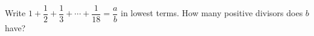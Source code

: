 Write $1+\dfrac{1}{2}+\dfrac{1}{3}+\cdots+\dfrac{1}{18}=\dfrac{a}{b}$ in lowest terms. How many positive divisors does $b$ have?
